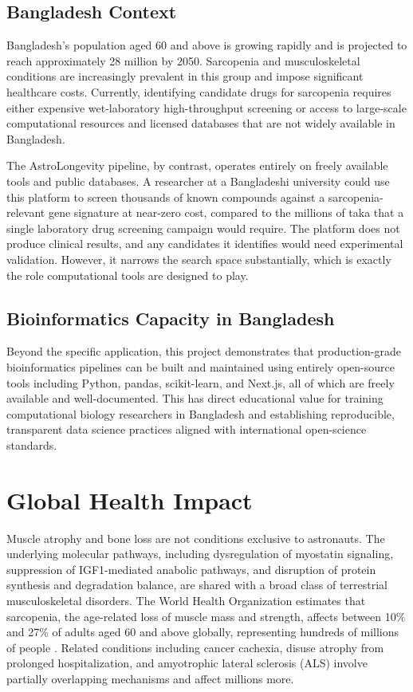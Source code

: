 \documentclass[conference]{IEEEtran}
\begin{document}
\subsection{Bangladesh Context}
Bangladesh's population aged 60 and above is growing rapidly and is projected to reach approximately 28 million by 2050. Sarcopenia and musculoskeletal conditions are increasingly prevalent in this group and impose significant healthcare costs. Currently, identifying candidate drugs for sarcopenia requires either expensive wet-laboratory high-throughput screening or access to large-scale computational resources and licensed databases that are not widely available in Bangladesh.

The AstroLongevity pipeline, by contrast, operates entirely on freely available tools and public databases. A researcher at a Bangladeshi university could use this platform to screen thousands of known compounds against a sarcopenia-relevant gene signature at near-zero cost, compared to the millions of taka that a single laboratory drug screening campaign would require. The platform does not produce clinical results, and any candidates it identifies would need experimental validation. However, it narrows the search space substantially, which is exactly the role computational tools are designed to play.

\subsection{Bioinformatics Capacity in Bangladesh}
Beyond the specific application, this project demonstrates that production-grade bioinformatics pipelines can be built and maintained using entirely open-source tools including Python, pandas, scikit-learn, and Next.js, all of which are freely available and well-documented. This has direct educational value for training computational biology researchers in Bangladesh and establishing reproducible, transparent data science practices aligned with international open-science standards.

\section{Global Health Impact}

Muscle atrophy and bone loss are not conditions exclusive to astronauts. The underlying molecular pathways, including dysregulation of myostatin signaling, suppression of IGF1-mediated anabolic pathways, and disruption of protein synthesis and degradation balance, are shared with a broad class of terrestrial musculoskeletal disorders. The World Health Organization estimates that sarcopenia, the age-related loss of muscle mass and strength, affects between 10\% and 27\% of adults aged 60 and above globally, representing hundreds of millions of people \cite{lloyd2023}. Related conditions including cancer cachexia, disuse atrophy from prolonged hospitalization, and amyotrophic lateral sclerosis (ALS) involve partially overlapping mechanisms and affect millions more.
\end{document}
